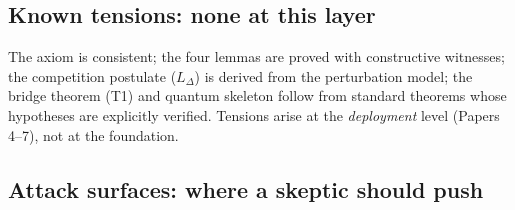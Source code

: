 \documentclass[11pt]{article}
\begin{document}
\subsection{Known tensions: none at this layer}

The axiom is consistent; the four lemmas are proved with constructive witnesses; the competition postulate ($L_\Delta$) is derived from the perturbation model; the bridge theorem (T1) and quantum skeleton follow from standard theorems whose hypotheses are explicitly verified.  Tensions arise at the \emph{deployment} level (Papers 4--7), not at the foundation.

\subsection{Attack surfaces: where a skeptic should push}
\end{document}
